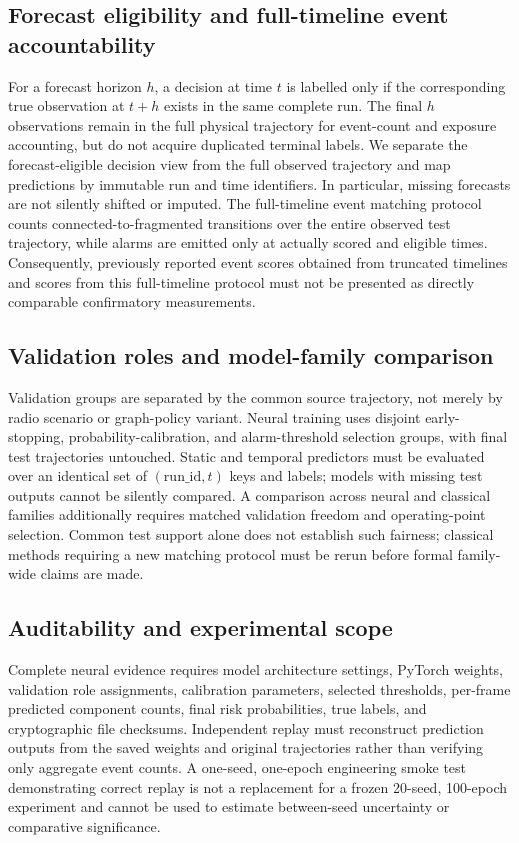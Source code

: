 \subsection{Forecast eligibility and full-timeline event accountability}
For a forecast horizon $h$, a decision at time $t$ is labelled only if the
corresponding true observation at $t+h$ exists in the same complete run. The
final $h$ observations remain in the full physical trajectory for event-count
and exposure accounting, but do not acquire duplicated terminal labels. We
separate the forecast-eligible decision view from the full observed trajectory
and map predictions by immutable run and time identifiers. In particular,
missing forecasts are not silently shifted or imputed. The full-timeline event
matching protocol counts connected-to-fragmented transitions over the entire
observed test trajectory, while alarms are emitted only at actually scored
and eligible times. Consequently, previously reported event scores obtained
from truncated timelines and scores from this full-timeline protocol must not
be presented as directly comparable confirmatory measurements.

\subsection{Validation roles and model-family comparison}
Validation groups are separated by the common source trajectory, not merely by
radio scenario or graph-policy variant. Neural training uses disjoint
early-stopping, probability-calibration, and alarm-threshold selection groups,
with final test trajectories untouched. Static and temporal predictors must
be evaluated over an identical set of $(\mathrm{run\_id},t)$ keys and labels;
models with missing test outputs cannot be silently compared. A comparison
across neural and classical families additionally requires matched validation
freedom and operating-point selection. Common test support alone does not
establish such fairness; classical methods requiring a new matching protocol
must be rerun before formal family-wide claims are made.

\subsection{Auditability and experimental scope}
Complete neural evidence requires model architecture settings, PyTorch weights,
validation role assignments, calibration parameters, selected thresholds,
per-frame predicted component counts, final risk probabilities, true labels,
and cryptographic file checksums. Independent replay must reconstruct
prediction outputs from the saved weights and original trajectories rather
than verifying only aggregate event counts. A one-seed, one-epoch engineering
smoke test demonstrating correct replay is not a replacement for a frozen
20-seed, 100-epoch experiment and cannot be used to estimate between-seed
uncertainty or comparative significance.

